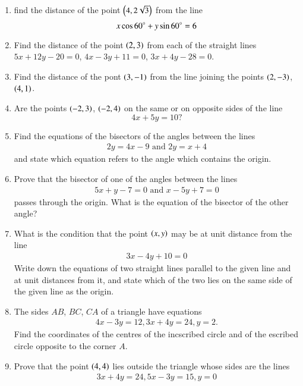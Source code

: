 \begin{enumerate}[1.]
\item find the distance of the point $\left(4,2\sqrt{3}\right)$ from the line 
\begin{equation}
x\cos 60\degree + y \sin 60\degree = 6
\end{equation}
\item Find the distance of the point $\left(2,3\right)$ from each of the straight lines $5x+12y-20=0$, $4x-3y+11=0$, $3x+4y-28=0$.
\item Find the distance of the pont $\left(3,-1\right)$ from the line joining the points $\left(2,-3\right)$, $\left(4,1\right)$.
\item Are the points $\left(-2,3\right)$, $\left(-2,4\right)$ on the same or on opposite sides of the line
\begin{equation*}
4x+5y = 10?
\end{equation*}
\item Find the equations of the bisectors of the angles between the lines
\begin{align*}
2y=4x-9 \text{ and } 2y= x+4
\end{align*}
and state which equation refers to the angle which contains the origin.
\item Prove that the bisector of one of the angles between the lines
\begin{align*}
5x+y-7 = 0 \text{ and } x -5y+7 = 0
\end{align*}
passes through the origin.  What is the equation of the bisector of the other angle?
\item What is the condition that the point $\left(x,y\right)$ may be at unit distance from the line
\begin{align*}
3x-4y+10 = 0
\end{align*}
Write down the equations of two straight lines parallel to the given line and at unit distances from it,
and state which of the two lies on the same side of the given line as the origin.
\item The sides $AB$, $BC$, $CA$ of a triangle have equations
\begin{align*}
4x-3y = 12, 3x+4y = 24, y = 2.
\end{align*}
Find the coordinates of the centres of the incscribed circle and of the escribed circle opposite to the corner $A$.
\item Prove that the point $\left(4,4\right)$ lies outside the triangle whose sides are the lines
\begin{align*}
3x+4y = 24, 5x - 3y = 15, y = 0
\end{align*}

\end{enumerate}

